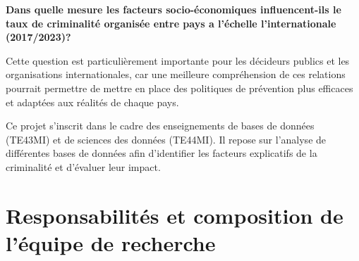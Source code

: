\documentclass[mstat,12pt]{unswthesis}
\begin{document}
\bigskip

\begin{center}

\textbf{Dans quelle mesure les facteurs socio-économiques influencent-ils le taux de criminalité organisée entre pays a l'échelle l'internationale (2017/2023)?}

\end{center}
\medskip

\justifying

Cette question est particulièrement importante pour les décideurs
publics et les organisations internationales, car une meilleure
compréhension de ces relations pourrait permettre de mettre en place des
politiques de prévention plus efficaces et adaptées aux réalités de
chaque pays.

\bigskip

Ce projet s'inscrit dans le cadre des enseignements de bases de données
(TE43MI) et de sciences des données (TE44MI). Il repose sur l'analyse de
différentes bases de données afin d'identifier les facteurs explicatifs
de la criminalité et d'évaluer leur impact.

\newpage

\section{Responsabilités et composition de l'équipe de
recherche}\label{responsabilituxe9s-et-composition-de-luxe9quipe-de-recherche}

\medskip
\end{document}
